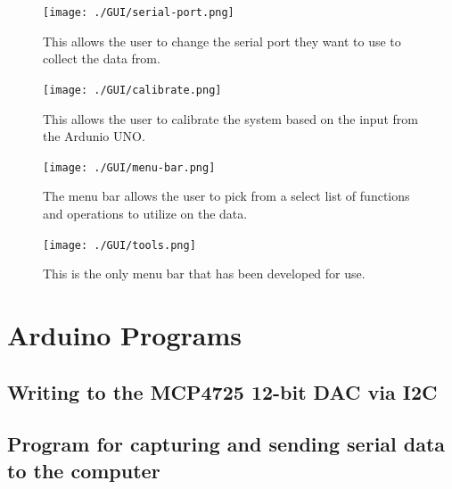 \documentclass[12pt,journal]{IEEEtran}
\newcommand\arduinostyle{\lstset{%
    language=C++,
    basicstyle=\footnotesize,%
    frame=tb,                         %
    showstringspaces=false            %
}}
\newcommand\arduinoexternal[2][]{{
\arduinostyle
}}
\begin{document}
\begin{appendices}
\begin{figure}[h!]
	\centering
	\texttt{[image: ./GUI/serial-port.png]}
	\caption{This allows the user to change the serial port they want to use to collect the data from.}
	\label{fig:GUI-serial-port}
\end{figure}
\newpage

\begin{figure}[h!]
	\centering
	\texttt{[image: ./GUI/calibrate.png]}
	\caption{This allows the user to calibrate the system based on the input from the Ardunio UNO.}
	\label{fig:GUI-calibrate}
\end{figure}
\newpage

\begin{figure}[h!]
	\centering
	\texttt{[image: ./GUI/menu-bar.png]}
	\caption{The menu bar allows the user to pick from a select list of functions and operations to utilize on the data.}
	\label{fig:GUI-menu-bar}
\end{figure}
\newpage

\begin{figure}[h!]
	\centering
	\texttt{[image: ./GUI/tools.png]}
	\caption{This is the only menu bar that has been developed for use.}
	\label{fig:GUI-tools}
\end{figure}

\newpage



\section{Arduino Programs}

\subsection{Writing to the MCP4725 12-bit DAC via I2C}

\arduinoexternal{../App/Arduino/sFPI-driver/sFPI-driver.ino}

\subsection{Program for capturing and sending serial data to the computer} \label{serial-data}

\arduinoexternal{../App/Arduino/Serial-data/Serial-data.ino}



\end{appendices}
\end{document}
